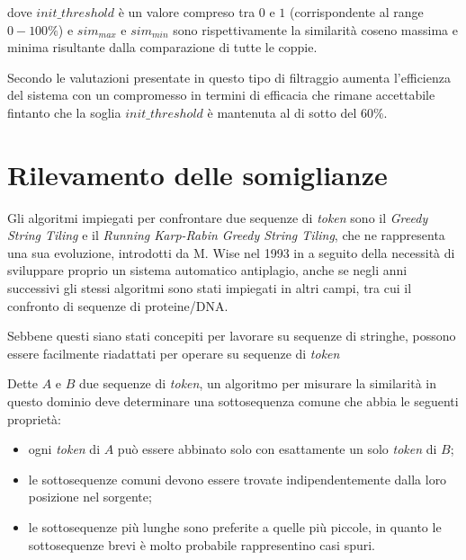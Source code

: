 dove $init\_threshold$ è un valore compreso tra $0$ e $1$ (corrispondente al range $0-100\%$) e $sim_{max}$ e $sim_{min}$ sono rispettivamente la similarità coseno massima e minima risultante dalla comparazione di tutte le coppie.

Secondo le valutazioni presentate in \cite{es-plag} questo tipo di filtraggio aumenta l'efficienza del sistema con un compromesso in termini di efficacia che rimane accettabile fintanto che la soglia $init\_threshold$ è mantenuta al di sotto del 60\%.

\section{Rilevamento delle somiglianze}
\label{03-matching-algorithms}
Gli algoritmi impiegati per confrontare due sequenze di \textit{token} sono il \textit{Greedy String Tiling} e il \textit{Running Karp-Rabin Greedy String Tiling}, che ne rappresenta una sua evoluzione, introdotti da M. Wise nel 1993 in \cite{wise-running-93} a seguito della necessità di sviluppare proprio un sistema automatico antiplagio, anche se negli anni successivi gli stessi algoritmi sono stati impiegati in altri campi, tra cui il confronto di sequenze di proteine/DNA.

Sebbene questi siano stati concepiti per lavorare su sequenze di stringhe, possono essere facilmente riadattati per operare su sequenze di \textit{token}

Dette $A$ e $B$ due sequenze di \textit{token}, un algoritmo per misurare la similarità in questo dominio deve determinare una sottosequenza comune che abbia le seguenti proprietà:
\begin{itemize}
	\item ogni \textit{token} di $A$ può essere abbinato solo con esattamente un solo \textit{token} di $B$;
	\item le sottosequenze comuni devono essere trovate indipendentemente dalla loro posizione nel sorgente;
	\item le sottosequenze più lunghe sono preferite a quelle più piccole, in quanto le sottosequenze brevi è molto probabile rappresentino casi spuri.
\end{itemize}

